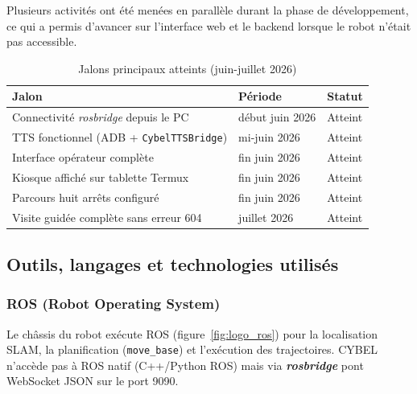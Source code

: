 Plusieurs activités ont été menées en parallèle durant la phase de
développement, ce qui a permis d'avancer sur l'interface web et le backend
lorsque le robot n'était pas accessible.

\begin{table}[H]
\centering
\caption{Jalons principaux atteints (juin-juillet 2026)}
\label{tab:jalons}
\small
\begin{tabular}{|p{4.0cm}|p{2.4cm}|p{3.2cm}|}
    \hline
    \textbf{Jalon} & \textbf{Période} & \textbf{Statut} \\
    \hline
    Connectivité \textit{rosbridge} depuis le PC & début juin 2026 & Atteint \\
    \hline
    TTS fonctionnel (ADB + \texttt{CybelTTSBridge}) & mi-juin 2026 & Atteint \\
    \hline
    Interface opérateur complète & fin juin 2026 & Atteint \\
    \hline
    Kiosque affiché sur tablette Termux & fin juin 2026 & Atteint \\
    \hline
    Parcours huit arrêts configuré & fin juin 2026 & Atteint \\
    \hline
    Visite guidée complète sans erreur 604 & juillet 2026 & Atteint \\
    \hline
    \end{tabular}
\end{table}


\subsection{Outils, langages et technologies utilisés}

\subsubsection{ROS (Robot Operating System)}

Le châssis du robot exécute ROS (figure~\ref{fig:logo_ros}) pour la
localisation SLAM, la planification (\texttt{move\_base}) et l'exécution des
trajectoires. CYBEL n'accède pas à ROS natif (C++/Python ROS) mais via
\textbf{\textit{rosbridge}} pont WebSocket JSON sur le port 9090.

